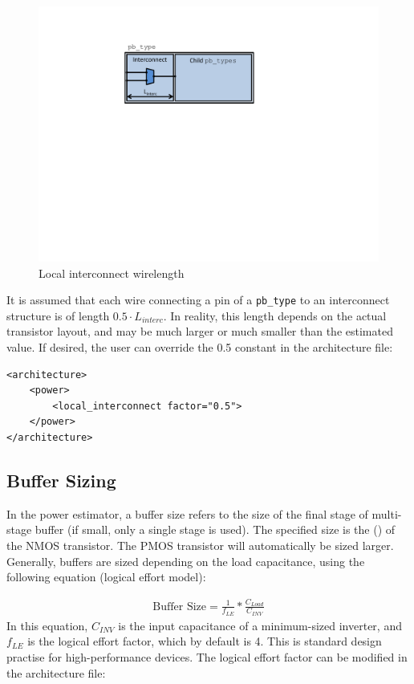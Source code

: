 \documentclass[letterpaper,twoside,10pt]{article}
\begin{document}
\begin{figure}[ht]
	\centering
		\includegraphics[scale=0.7]{images/local_interc_wirelength.pdf}
	\caption{Local interconnect wirelength}
	\label{fig:local_interc_wirelength}
\end{figure}

It is assumed that each wire connecting a pin of a \texttt{pb\_type} to an interconnect structure is of length $0.5 \cdot L_{interc}$.  In reality, this length depends on the actual transistor
layout, and may be much larger or much smaller than the estimated value.  If desired, the user can override the 0.5 constant in the architecture file:

\begin{BVerbatim}[bgcolor=LightGray, boxwidth=\textwidth] 
<architecture>
	<power>
		<local_interconnect factor="0.5">
	</power>
</architecture>
\end{BVerbatim}

\subsection{Buffer Sizing} \label{sec:buffer_sizing}
In the power estimator, a buffer size refers to the size of the final stage of multi-stage buffer (if small, only a single stage is used).  The specified size is the () of the NMOS transistor.  The PMOS transistor will automatically be sized larger.    
Generally, buffers are sized depending on the load capacitance, using the following equation (logical effort model):

\begin{align}
	\text{Buffer Size}=\frac{1}{f_{LE}}*\frac{C_{Load}}{C_{INV}}
	\label{eq:autosize}
\end{align}	
In this equation, $C_{INV}$ is the input capacitance of a minimum-sized inverter, and $f_{LE}$ is the logical effort factor, which by default is 4.  This is standard design practise for high-performance devices.  The logical effort factor can be modified in the architecture file: 
\end{document}
